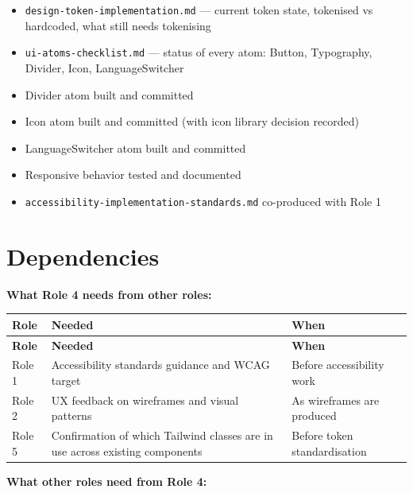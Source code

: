 \documentclass[12pt,a4paper]{article}
\begin{document}
\begin{itemize}
    \item[$\square$] \texttt{design-token-implementation.md} --- current token state, tokenised vs hardcoded, what still needs tokenising
    \item[$\square$] \texttt{ui-atoms-checklist.md} --- status of every atom: Button, Typography, Divider, Icon, LanguageSwitcher
    \item[$\square$] Divider atom built and committed
    \item[$\square$] Icon atom built and committed (with icon library decision recorded)
    \item[$\square$] LanguageSwitcher atom built and committed
    \item[$\square$] Responsive behavior tested and documented
    \item[$\square$] \texttt{accessibility-implementation-standards.md} co-produced with Role 1
\end{itemize}

\section{Dependencies}

\noindent\textbf{What Role 4 needs from other roles:}

\vspace{0.5em}
\begin{longtable}{@{}p{2cm}p{6.5cm}p{3.8cm}@{}}
\toprule
\rowcolor{uvtLightBlue}
\textbf{Role} & \textbf{Needed} & \textbf{When} \\
\midrule
\endfirsthead
\toprule
\rowcolor{uvtLightBlue}
\textbf{Role} & \textbf{Needed} & \textbf{When} \\
\midrule
\endhead
\bottomrule
\endfoot
Role 1 & Accessibility standards guidance and WCAG target & Before accessibility work \\
Role 2 & UX feedback on wireframes and visual patterns & As wireframes are produced \\
Role 5 & Confirmation of which Tailwind classes are in use across existing components & Before token standardisation \\
\end{longtable}

\vspace{0.8em}
\noindent\textbf{What other roles need from Role 4:}
\end{document}
